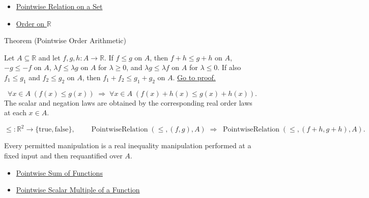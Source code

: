 \begin{dependencies}
\begin{itemize}
  \item \hyperref[def:pointwise-relation-on-set]{Pointwise Relation on a Set}
  \item \hyperref[def:order-on-r]{Order on \(\mathbb{R}\)}
\end{itemize}
\end{dependencies}

\begin{theorembox}{Theorem (Pointwise Order Arithmetic)}
\begin{theorem}
\label{thm:pointwise-order-arithmetic}
Let \(A\subseteq\mathbb{R}\) and let \(f,g,h:A\to\mathbb{R}\).  If
\(f\leq g\) on \(A\), then \(f+h\leq g+h\) on \(A\),
\(-g\leq -f\) on \(A\), \(\lambda f\leq\lambda g\) on \(A\) for
\(\lambda\geq0\), and \(\lambda g\leq\lambda f\) on \(A\) for
\(\lambda\leq0\).  If also \(f_1\leq g_1\) and \(f_2\leq g_2\) on \(A\),
then \(f_1+f_2\leq g_1+g_2\) on \(A\).
\hyperref[prf:pointwise-order-arithmetic]{Go to proof.}
\end{theorem}
\end{theorembox}

\begin{remark*}
\[
  \forall x\in A\;(f(x)\leq g(x))
  \;\Longrightarrow\;
  \forall x\in A\;(f(x)+h(x)\leq g(x)+h(x)).
\]
The scalar and negation laws are obtained by the corresponding real order laws
at each \(x\in A\).
\end{remark*}

\begin{remark*}
\[
  \leq\colon \mathbb{R}^2\to\{\mathrm{true},\mathrm{false}\},\qquad
  \operatorname{PointwiseRelation}(\leq,(f,g),A)
  \;\Longrightarrow\;
  \operatorname{PointwiseRelation}(\leq,(f+h,g+h),A).
\]
\end{remark*}

\begin{remark*}[Interpretation]
Every permitted manipulation is a real inequality manipulation performed at a
fixed input and then requantified over \(A\).
\end{remark*}

\begin{dependencies}
\begin{itemize}
  \item \hyperref[def:pointwise-sum-of-functions]{Pointwise Sum of Functions}
  \item \hyperref[def:pointwise-scalar-multiple-of-a-function]{Pointwise Scalar Multiple of a Function}
\end{itemize}
\end{dependencies}

